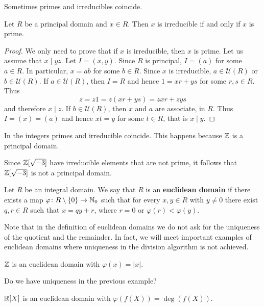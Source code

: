 Sometimes primes and irreducibles coincide. 

\begin{proposition}
	Let $R$ be a principal domain and $x\in R$. 
	Then $x$ is irreducible if and only if $x$ is prime. 	
\end{proposition}

\begin{proof}
	We only need to prove that if $x$ is irreducible, then $x$ is prime. Let us
	assume that $x\mid yz$. Let $I=(x,y)$. Since $R$ is principal, $I=(a)$ for some $a\in R$. In particular, $x=ab$ for some $b\in R$. Since $x$ is irreducible, $a\in\mathcal{U}(R)$ or
	$b\in\mathcal{U}(R)$. If $a\in\mathcal{U}(R)$, then $I=R$ and hence 
	$1=xr+ys$ for some $r,s\in R$. Thus
	\[
	z=z1=z(xr+ys)=zxr+zys
	\]
	and therefore $x\mid z$. If $b\in\mathcal{U}(R)$, then $x$ and $a$ are associate, 
	in $R$. Thus $I=(x)=(a)$ and hence $xt=y$ for some $t\in R$, that is $x\mid y$.  
\end{proof}

In the integers primes and irreducible coincide. This happens 
because $\mathbb{Z}$ is a principal domain.

\begin{example}
	Since $\mathbb{Z}[\sqrt{-3}]$ have irreducible elements that are not prime, it follows that
	$\mathbb{Z}[\sqrt{-3}]$ is not a principal domain.
\end{example}

\begin{definition}
	Let $R$ be an integral domain. We say that $R$ is an \textbf{euclidean domain}
	if there exists a map $\varphi\colon R\setminus\{0\}\to\mathbb{N}_0$ such that
	for every $x,y\in R$ with $y\ne 0$ there exist $q,r\in R$ such that 
	$x=qy+r$, where $r=0$ or $\varphi(r)<\varphi(y)$. 
\end{definition}

Note that in the definition of euclidean domains we do not ask for the uniqueness 
of the quotient and the remainder. In fact, 
we will meet important examples of euclidean domains where uniqueness
in the division algorithm is not achieved. 

\begin{example}
	$\mathbb{Z}$ is an euclidean domain with $\varphi(x)=|x|$.
\end{example}

Do we have uniqueness in the previous example? 	

\begin{example}
	$\mathbb{R}[X]$ is an euclidean domain with $\varphi(f(X))=\deg(f(X))$. 	
\end{example}

